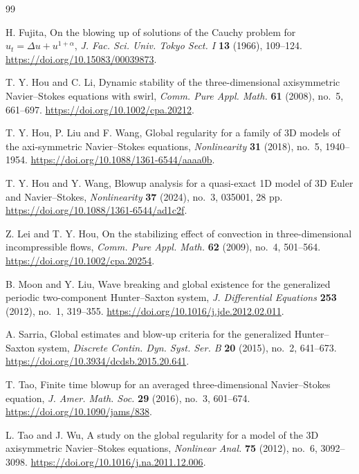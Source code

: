 \documentclass[11pt]{article}
\theoremstyle{definition}
\begin{document}
\begin{thebibliography}{99}

H. Fujita,
On the blowing up of solutions of the Cauchy problem for $u_t=\Delta u+u^{1+\alpha}$,
\emph{J. Fac. Sci. Univ. Tokyo Sect. I} \textbf{13} (1966), 109--124.
\url{https://doi.org/10.15083/00039873}.

T. Y. Hou and C. Li,
Dynamic stability of the three-dimensional axisymmetric Navier--Stokes equations with swirl,
\emph{Comm. Pure Appl. Math.} \textbf{61} (2008), no.~5, 661--697.
\url{https://doi.org/10.1002/cpa.20212}.

T. Y. Hou, P. Liu and F. Wang,
Global regularity for a family of 3D models of the axi-symmetric Navier--Stokes equations,
\emph{Nonlinearity} \textbf{31} (2018), no.~5, 1940--1954.
\url{https://doi.org/10.1088/1361-6544/aaaa0b}.


T. Y. Hou and Y. Wang,
Blowup analysis for a quasi-exact 1D model of 3D Euler and Navier--Stokes,
\emph{Nonlinearity} \textbf{37} (2024), no.~3, 035001, 28 pp.
\url{https://doi.org/10.1088/1361-6544/ad1c2f}.

Z. Lei and T. Y. Hou,
On the stabilizing effect of convection in three-dimensional incompressible flows,
\emph{Comm. Pure Appl. Math.} \textbf{62} (2009), no.~4, 501--564.
\url{https://doi.org/10.1002/cpa.20254}.

B. Moon and Y. Liu,
Wave breaking and global existence for the generalized periodic two-component Hunter--Saxton system,
\emph{J. Differential Equations} \textbf{253} (2012), no.~1, 319--355.
\url{https://doi.org/10.1016/j.jde.2012.02.011}.

A. Sarria,
Global estimates and blow-up criteria for the generalized Hunter--Saxton system,
\emph{Discrete Contin. Dyn. Syst. Ser. B} \textbf{20} (2015), no.~2, 641--673.
\url{https://doi.org/10.3934/dcdsb.2015.20.641}.

T. Tao,
Finite time blowup for an averaged three-dimensional Navier--Stokes equation,
\emph{J. Amer. Math. Soc.} \textbf{29} (2016), no.~3, 601--674.
\url{https://doi.org/10.1090/jams/838}.

L. Tao and J. Wu,
A study on the global regularity for a model of the 3D axisymmetric Navier--Stokes equations,
\emph{Nonlinear Anal.} \textbf{75} (2012), no.~6, 3092--3098.
\url{https://doi.org/10.1016/j.na.2011.12.006}.


\end{thebibliography}
\end{document}
